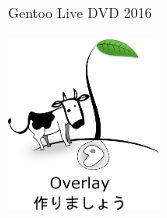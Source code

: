 \documentclass{cd-cover}
\begin{document}
\CDbookletTopMargin=0pt
\CDbookletMargin=0pt
\begin{bookletsheets}
\vspace*{5mm}
\hspace{5mm}
\begin{center}
{\LARGE Gentoo Live DVD 2016}\par\bigskip
\includegraphics[width=4cm]{larry0}
\end{center}
\end{bookletsheets}
\end{document}

